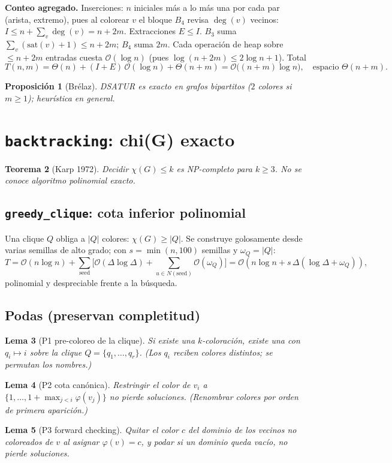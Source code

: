 \documentclass[11pt,a4paper]{article}
\newtheorem{teorema}{Teorema}[section]
\newtheorem{lema}[teorema]{Lema}
\newtheorem{proposicion}[teorema]{Proposición}
\theoremstyle{definition}
\theoremstyle{remark}
\newcommand{\dg}{\operatorname{deg}}
\newcommand{\bigO}{\mathcal{O}}
\begin{document}
\textbf{Conteo agregado.} Inserciones: $n$ iniciales más a lo más una por cada
par (arista, extremo), pues al colorear $v$ el bloque $B_4$ revisa $\dg(v)$
vecinos: $I\le n+\sum_v\dg(v)=n+2m$. Extracciones $E\le I$. $B_3$ suma
$\sum_v(\mathrm{sat}(v){+}1)\le n+2m$; $B_4$ suma $2m$. Cada operación de heap
sobre $\le n+2m$ entradas cuesta $\bigO(\log n)$ (pues $\log(n+2m)\le 2\log n+1$).
Total
\[
T(n,m)=\Theta(n)+(I+E)\,\bigO(\log n)+\Theta(n+m)=\boxed{\bigO\big((n+m)\log n\big)},
\quad\text{espacio }\Theta(n+m).
\]
\begin{proposicion}[Brélaz]
DSATUR es exacto en grafos bipartitos ($2$ colores si $m\ge1$); heurística en general.
\end{proposicion}

\section{\texttt{backtracking}: chi(G) exacto}\label{sec:bt}
\begin{teorema}[Karp 1972]
Decidir $\chi(G)\le k$ es NP-completo para $k\ge3$. No se conoce algoritmo
polinomial exacto.
\end{teorema}

\subsection{\texttt{greedy\_clique}: cota inferior polinomial}
Una clique $Q$ obliga a $|Q|$ colores: $\chi(G)\ge|Q|$. Se construye golosamente
desde varias semillas de alto grado; con $s=\min(n,100)$ semillas y
$\omega_Q=|Q|$:
\[
T=\bigO(n\log n)+\sum_{\text{seed}}\big[\bigO(\Delta\log\Delta)+
\textstyle\sum_{u\in N(\text{seed})}\bigO(\omega_Q)\big]
=\bigO(n\log n+s\,\Delta(\log\Delta+\omega_Q)),
\]
polinomial y despreciable frente a la búsqueda.

\subsection{Podas (preservan completitud)}
\begin{lema}[P1 pre-coloreo de la clique]
Si existe una $k$-coloración, existe una con $q_i\mapsto i$ sobre la clique
$Q=\{q_1,\dots,q_r\}$. \emph{(Los $q_i$ reciben colores distintos; se permutan los
nombres.)}
\end{lema}
\begin{lema}[P2 cota canónica]
Restringir el color de $v_i$ a $\{1,\dots,1+\max_{j<i}\varphi(v_j)\}$ no pierde
soluciones. \emph{(Renombrar colores por orden de primera aparición.)}
\end{lema}
\begin{lema}[P3 forward checking]
Quitar el color $c$ del dominio de los vecinos no coloreados de $v$ al asignar
$\varphi(v){=}c$, y podar si un dominio queda vacío, no pierde soluciones.
\end{lema}
\end{document}
